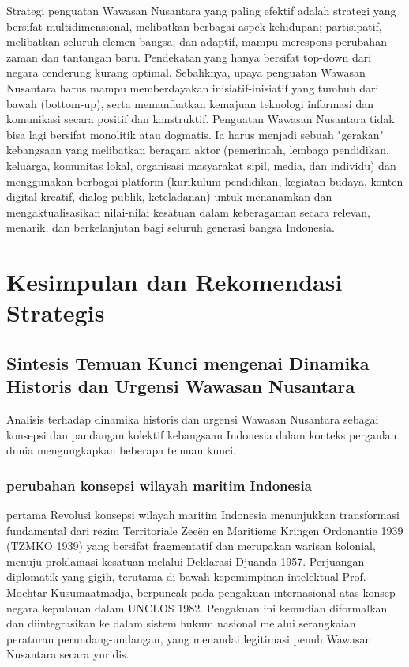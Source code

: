 \documentclass[12pt, a4paper]{article}
\begin{document}
Strategi penguatan Wawasan Nusantara yang paling efektif adalah strategi yang bersifat multidimensional, melibatkan berbagai aspek kehidupan; partisipatif, melibatkan seluruh elemen bangsa; dan adaptif, mampu merespons perubahan zaman dan tantangan baru. Pendekatan yang hanya bersifat top-down dari negara cenderung kurang optimal. Sebaliknya, upaya penguatan Wawasan Nusantara harus mampu memberdayakan inisiatif-inisiatif yang tumbuh dari bawah (bottom-up), serta memanfaatkan kemajuan teknologi informasi dan komunikasi secara positif dan konstruktif. Penguatan Wawasan Nusantara tidak bisa lagi bersifat monolitik atau dogmatis. Ia harus menjadi sebuah "gerakan" kebangsaan yang melibatkan beragam aktor (pemerintah, lembaga pendidikan, keluarga, komunitas lokal, organisasi masyarakat sipil, media, dan individu) dan menggunakan berbagai platform (kurikulum pendidikan, kegiatan budaya, konten digital kreatif, dialog publik, keteladanan) untuk menanamkan dan mengaktualisasikan nilai-nilai kesatuan dalam keberagaman secara relevan, menarik, dan berkelanjutan bagi seluruh generasi bangsa Indonesia.
\section{Kesimpulan dan Rekomendasi Strategis}
\subsection*{Sintesis Temuan Kunci mengenai Dinamika Historis dan Urgensi Wawasan Nusantara}

Analisis terhadap dinamika historis dan urgensi Wawasan Nusantara sebagai konsepsi dan pandangan kolektif kebangsaan Indonesia dalam konteks pergaulan dunia mengungkapkan beberapa temuan kunci. 
\subsubsection*{perubahan konsepsi wilayah maritim Indonesia} \label{perubahan-konsepsi-wilayah-maritim-indonesia} pertama Revolusi konsepsi wilayah maritim Indonesia menunjukkan transformasi fundamental dari rezim Territoriale Zeeën en Maritieme Kringen Ordonantie 1939 (TZMKO 1939)\cite{TZMKO} yang bersifat fragmentatif dan merupakan warisan kolonial, menuju proklamasi kesatuan melalui Deklarasi Djuanda 1957. Perjuangan diplomatik yang gigih, terutama di bawah kepemimpinan intelektual Prof. Mochtar Kusumaatmadja, berpuncak pada pengakuan internasional atas konsep negara kepulauan dalam UNCLOS 1982. Pengakuan ini kemudian diformalkan dan diintegrasikan ke dalam sistem hukum nasional melalui serangkaian peraturan perundang-undangan, yang menandai legitimasi penuh Wawasan Nusantara secara yuridis.
\end{document}
